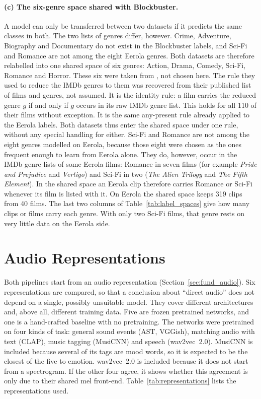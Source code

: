 \paragraph{(c) The six-genre space shared with Blockbuster.}
A model can only be transferred between two datasets if it predicts the same classes in both. The two lists of genres differ, however. Crime, Adventure, Biography and Documentary do not exist in the Blockbuster labels, and Sci-Fi and Romance are not among the eight Eerola genres. Both datasets are therefore relabelled into one shared space of six genres: Action, Drama, Comedy, Sci-Fi, Romance and Horror. These six were taken from \citet{ma2021computational}, not chosen here. The rule they used to reduce the IMDb genres to them was recovered from their published list of films and genres, not assumed. It is the identity rule: a film carries the reduced genre $g$ if and only if $g$ occurs in its raw IMDb genre list. This holds for all 110 of their films without exception. It is the same any-present rule already applied to the Eerola labels. Both datasets thus enter the shared space under one rule, without any special handling for either. Sci-Fi and Romance are not among the eight genres modelled on Eerola, because those eight were chosen as the ones frequent enough to learn from Eerola alone. They do, however, occur in the IMDb genre lists of some Eerola films: Romance in seven films (for example \emph{Pride and Prejudice} and \emph{Vertigo}) and Sci-Fi in two (\emph{The Alien Trilogy} and \emph{The Fifth Element}). In the shared space an Eerola clip therefore carries Romance or Sci-Fi whenever its film is listed with it. On Eerola the shared space keeps 319 clips from 40 films. The last two columns of Table~\ref{tab:label_spaces} give how many clips or films carry each genre. With only two Sci-Fi films, that genre rests on very little data on the Eerola side.

\section{Audio Representations}
\label{sec:methods_features}

Both pipelines start from an audio representation (Section~\ref{sec:fund_audio}). Six representations are compared, so that a conclusion about ``direct audio'' does not depend on a single, possibly unsuitable model. They cover different architectures and, above all, different training data. Five are frozen pretrained networks, and one is a hand-crafted baseline with no pretraining. The networks were pretrained on four kinds of task: general sound events (AST, VGGish), matching audio with text (CLAP), music tagging (MusiCNN) and speech (wav2vec~2.0). MusiCNN is included because several of its tags are mood words, so it is expected to be the closest of the five to emotion. wav2vec~2.0 is included because it does not start from a spectrogram. If the other four agree, it shows whether this agreement is only due to their shared mel front-end. Table~\ref{tab:representations} lists the representations used.

